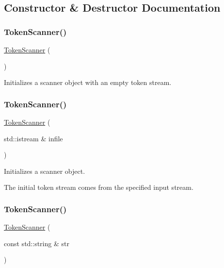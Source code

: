 \subsection{Constructor \& Destructor Documentation}
\mbox{\label{classTokenScanner_a284595cf3c3df7d3e70ef2dcdc1f0292}} 
\subsubsection{\texorpdfstring{Token\+Scanner()}{TokenScanner()}\hspace{0.1cm}{\footnotesize\ttfamily [1/3]}}
{\footnotesize\ttfamily \mbox{\hyperlink{classTokenScanner}{Token\+Scanner}} (\begin{DoxyParamCaption}{ }\end{DoxyParamCaption})}



Initializes a scanner object with an empty token stream. 

\mbox{\label{classTokenScanner_aa82b5fa6beae663f87eaa0ae964a48b3}} 
\subsubsection{\texorpdfstring{Token\+Scanner()}{TokenScanner()}\hspace{0.1cm}{\footnotesize\ttfamily [2/3]}}
{\footnotesize\ttfamily \mbox{\hyperlink{classTokenScanner}{Token\+Scanner}} (\begin{DoxyParamCaption}\item[{std\+::istream \&}]{infile }\end{DoxyParamCaption})}



Initializes a scanner object. 

The initial token stream comes from the specified input stream. \mbox{\label{classTokenScanner_a55859460fe8f07596fbc93d91314254a}} 
\subsubsection{\texorpdfstring{Token\+Scanner()}{TokenScanner()}\hspace{0.1cm}{\footnotesize\ttfamily [3/3]}}
{\footnotesize\ttfamily \mbox{\hyperlink{classTokenScanner}{Token\+Scanner}} (\begin{DoxyParamCaption}\item[{const std\+::string \&}]{str }\end{DoxyParamCaption})}



